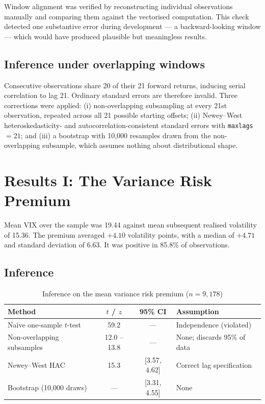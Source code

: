 \documentclass[11pt,a4paper]{article}
\begin{document}
Window alignment was verified by reconstructing individual observations manually and comparing them
against the vectorised computation. This check detected one substantive error during development ---
a backward-looking window --- which would have produced plausible but meaningless results.

\subsection{Inference under overlapping windows}

Consecutive observations share 20 of their 21 forward returns, inducing serial correlation to lag 21.
Ordinary standard errors are therefore invalid. Three corrections were applied: (i) non-overlapping
subsampling at every 21st observation, repeated across all 21 possible starting offsets; (ii)
Newey--West heteroskedasticity- and autocorrelation-consistent standard errors with \texttt{maxlags}
$=21$; and (iii) a bootstrap with 10,000 resamples drawn from the non-overlapping subsample, which
assumes nothing about distributional shape.

\section{Results I: The Variance Risk Premium}

Mean VIX over the sample was 19.44 against mean subsequent realised volatility of 15.36. The premium
averaged $+4.10$ volatility points, with a median of $+4.71$ and standard deviation of 6.63. It was
positive in 85.8\% of observations.

\subsection{Inference}

\begin{table}[h]
\centering
\caption{Inference on the mean variance risk premium ($n=9{,}178$)}
\begin{tabular}{@{}lccl@{}}
\toprule
Method & $t$ / $z$ & 95\% CI & Assumption \\
\midrule
Na\"ive one-sample $t$-test & 59.2 & --- & Independence (violated) \\
Non-overlapping subsamples & 12.0 -- 13.8 & --- & None; discards 95\% of data \\
Newey--West HAC & 15.3 & [3.57, 4.62] & Correct lag specification \\
Bootstrap (10,000 draws) & --- & [3.31, 4.55] & None \\
\bottomrule
\end{tabular}
\end{table}
\end{document}
